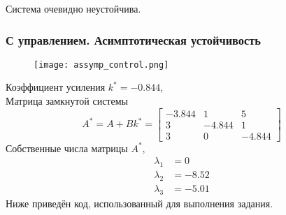     Система очевидно неустойчива.

    \subsubsection*{С управлением. Асимптотическая устойчивость}
    \begin{figure}[H]
        \centering
        \texttt{[image: assymp\_control.png]}
    \end{figure}
    Коэффициент усиления $k^* = -0.844$,\\
    Матрица замкнутой системы
    \begin{equation*}
        A^* = A + Bk^* =
        \begin{bmatrix}
            -3.844& 1& 5\\
            3& -4.844& 1\\
            3& 0& -4.844
        \end{bmatrix}
    \end{equation*}
    Собственные числа матрицы $A^*$,
    \begin{equation*}
        \begin{aligned}
            \lambda_1 &= 0 \\
            \lambda_2 &= -8.52\\
            \lambda_3 &= -5.01
        \end{aligned}
    \end{equation*}
    Ниже приведён код, использованный для выполнения задания.
    \inputminted[linenos, frame=single, breakanywhere]{octave}{../src/L1T3.m}


